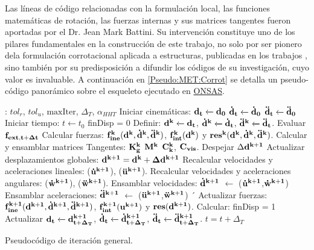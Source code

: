 Las líneas de código relacionadas con la formulación local, las funciones matemáticas de rotación, las fuerzas internas y sus matrices tangentes fueron aportadas por el Dr. Jean Mark Battini. Su intervención constituye uno de los pilares fundamentales en la construcción de este trabajo, no solo por ser pionero dela formulación corrotacional aplicada a estructuras, publicadas en los trabajos \citep{Battini2002} \citep{Le2014}, sino también por su predisposición a difundir los códigos de su investigación, cuyo valor es invaluable. A continuación en \ref{Pseudo:MET:Corrot} se detalla un pseudo-código panorámico sobre el esqueleto ejecutado en \href{https://github.com/ONSAS/ONSAS/}{ONSAS}. 

\begin{algorithm}\label{Pseudo:MET:Corrot}
	\begin{algorithmic} 
		\REQUIRE: $tol_r$, $tol_u$, $\text{maxIter}$, $\Delta_T$, $\alpha_{HHT}$
		\STATE Iniciar cinemáticas: $\bf{d_t}\xleftarrow[]{}\bf{d_0}$
		$\bf{\dot{d}_t}\xleftarrow[]{}\bf{\dot{d}_0}$
		$\bf{\ddot{d}_t}\xleftarrow[]{}\bf{\ddot{d}_0}$ 
		\STATE Iniciar tiempo: $t\xleftarrow{}t_0$
			\STATE finDisp = $0$
			\STATE Definir: $\bf{d^k}\xleftarrow[]{}\bf{d_t}$, $\bf{\dot{d}^k}\xleftarrow[]{}\bf{\dot{d}_t}$, $\bf{\ddot{d}^k}\xleftarrow[]{}\bf{\ddot{d}_t}$.
			\STATE Evaluar $\bf{f_{ext,t+\Delta t}}$	
				\STATE Calcular fuerzas: $\bf{f}_{ine}^k(\bf{d}^k,\bf{\dot{d}}^k,\bf{\ddot{d}}^k)$,  $\bf{f}_{int}^k(\bf{d}^k)$ y $\bf{res}^{k}(\bf{d}^k,\bf{\dot{d}}^k,\bf{\ddot{d}}^k)$. 
				\STATE Calcular y ensamblar matrices Tangentes: $\bf{K}_g^k$ $\bf{M}^k$  $\bf{C}_k^k$, $\bf{C}_{vis}$. 
				\STATE Despejar $\Delta \bf{d}^{k+1}$ 
				\STATE Actualizar desplazamientos globales:  $\bf{d}^{k+1} = \bf{d}^{k} + \Delta\bf{d}^{k+1}$ 
				\STATE Recalcular velocidades y aceleraciones lineales: ($\bf{\dot{u}}^{k+1}$), ($\bf{\ddot{u}}^{k+1}$).
				\STATE Recalcular velocidades y aceleraciones angulares: ($\bf{\dot{w}}^{k+1}$), ($\bf{\ddot{w}}^{k+1}$).
				\STATE Ensamblar velocidades: $\bf{\dot{d}}^{k+1}$ $\leftarrow$ ($\bf{\dot{u}}^{k+1}$,$\bf{\dot{w}}^{k+1}$)
				\STATE Ensamblar aceleraciones: $\bf{\ddot{d}}^{k+1}$ $\leftarrow$ ($\bf{\ddot{u}}^{k+1}$,$\bf{\ddot{w}}^{k+1}$)
´				\STATE Actualizar fuerzas: 	$\bf{f}_{ine}^{k+1}(\bf{d}^{k+1},\bf{\dot{d}}^{k+1},\bf{\ddot{d}}^{k+1})$,  $\bf{f}_{int}^{k+1}(\bf{u}^{k+1})$ y $\bf{res}(\bf{d}^{k+1})$. 
				\STATE Calcular: 
				\STATE finDisp = 1
				\ENDIF
			\ENDWHILE
			\STATE Actualizar $\bf{d_{t}}\xleftarrow[]{}\bf{d^{k+1}_{t+\Delta_T}}$, $\bf{\dot{d}_{t}}\xleftarrow[]{}\bf{\dot{d}^{k+1}_{t+\Delta_T}}$, $\bf{\ddot{d}_t}\xleftarrow[]{}\bf{\ddot{d}^{k+1}_{t+\Delta_T}}$.
			\STATE $t = t+\Delta_T$	
 		\ENDWHILE
	\end{algorithmic}
\caption{Pseudocódigo de iteración general. }
\end{algorithm}

